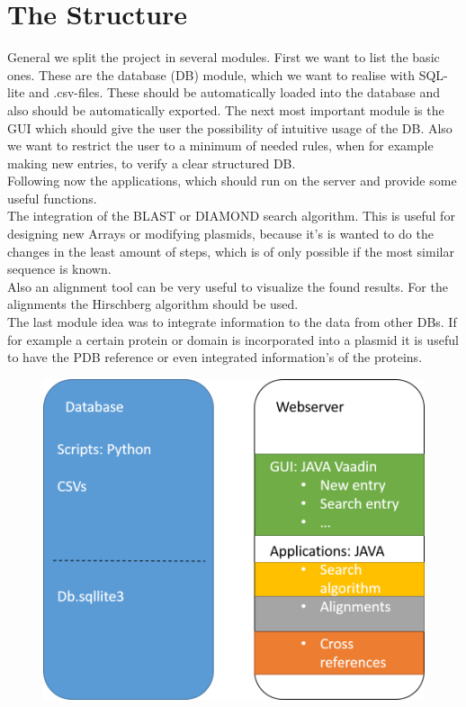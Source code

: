 \documentclass[]{article}
\begin{document}
\section{ The Structure}
General we split the project in several modules. First we want to list the basic ones. These are the database (DB) module, which we want to realise with SQL-lite and .csv-files. These should be automatically loaded into the database and also should be automatically exported.
The next most important module is the GUI which should give the user the possibility of intuitive usage of the DB. Also we want to restrict the user to a minimum of needed rules, when for example making new entries, to verify a clear structured DB.\\
Following now the applications, which should run on the server and provide some useful functions.\\
The integration of the BLAST or DIAMOND search algorithm. This is useful for designing new Arrays or modifying plasmids, because it's is wanted to do the changes in the least amount of steps, which is of only possible if the most similar sequence is known.\\
Also an alignment tool can be very useful to visualize the found results. For the alignments the Hirschberg algorithm should be used.\\
The last module idea was to integrate information to the data from other DBs. If for example a certain protein or domain is incorporated into a plasmid it is useful to have the PDB reference or even integrated information’s of the proteins.

	\begin{figure}[h]
		\includegraphics[width=\textwidth]{../img/Structure.png}
	\end{figure}
\end{document}
